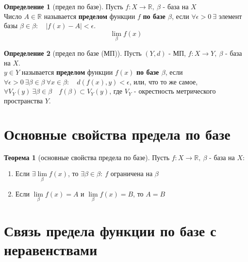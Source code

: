 \documentclass{report}
\theoremstyle{definition}
\newtheorem*{definition}{Определение}
\newtheorem*{theorem}{Теорема}
\begin{document}
\begin{definition}[предел по базе]
    Пусть $f:X\rightarrow\mathbb{R}, \ \beta$ - база на $X$\\

    Число $A\in\mathbb{R}$ называется \textbf{пределом} функции $f$ \textbf{по базе $\beta$}, если
    $\forall \epsilon > 0 \ \exists$ элемент базы $\beta \in \beta: \quad |f(x) - A| < \epsilon$.
    \begin{equation*}
        \underset{\beta}{\lim} f(x)
    \end{equation*}
\end{definition}

\begin{definition}[предел по базе (МП)]
    Пусть $(Y, d)$ - МП, $f:X\rightarrow Y, \ \beta$ - база на $X$.\\

    $y\in Y$ называется \textbf{пределом} функции $f(x)$ \textbf{по базе $\beta$}, если $\forall \epsilon > 0 \
        \exists \beta \in \beta \ \forall x \in \beta: \quad d(f(x), y) < \epsilon$, или, что то же самое,
    $\forall V_{Y}(y) \ \exists \beta \in \beta \quad f(\beta) \subset V_{Y}(y)$, где $V_{Y}$ - окрестность
    метрического пространства $Y$.
\end{definition}

\section{Основные свойства предела по базе}

\begin{theorem}[основные свойства предела по базе]
    Пусть $f:X\rightarrow\mathbb{R}, \ \beta$ - база на $X$:
    \begin{enumerate}
        \item Если $\exists \underset{\beta}{\lim}f(x)$, то $\exists \beta \in \beta: \ f$ ограничена на $\beta$
        \item Если $\underset{\beta}{\lim}f(x) = A$ и $\underset{\beta}{\lim}f(x) = B$, то $A = B$
    \end{enumerate}
\end{theorem}

\section{Связь предела функции по базе с неравенствами}
\end{document}
